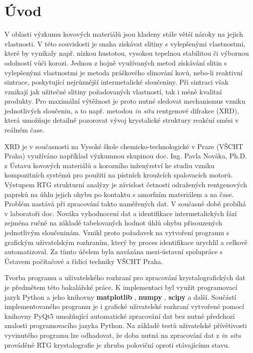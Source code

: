 \documentclass[a4paper, 12pt]{article}
\begin{document}
\newpage

\tableofcontents
\newpage

\pagestyle{fancy}
\section{Úvod}
V oblasti výzkumu kovových materiálů jsou kladeny stále větší nároky na jejich vlastnosti. V této souvislosti je snaha získávat slitiny s vylepšenými vlastnostmi, které by vynikaly např. nízkou hustotou, vysokou tepelnou stabilitou či výbornou odolností vůči korozi. \cite{NOVAK2009123} Jednou z hojně využívaných metod získávání slitin s vylepšenými vlastnostmi je metoda práškového slinování kovů, nebo-li reaktivní sintrace, poskytující nejrůznější intermetalické sloučeniny. \cite{novak2012pvriprava} Při sintraci však vznikají jak užitečné slitiny požadovaných vlastností, tak i méně kvalitní produkty. Pro maximální výtěžnost je proto nutné sledovat mechanismus vzniku jednotlivých sloučenin, a to např. metodou \textit{in situ} rentgenové difrakce (XRD), která umožňuje detailně pozorovat vývoj krystalické struktury reakční směsi v reálném čase. \cite{NOVAKxrd} \par

XRD je v současnosti na Vysoké škole chemicko-technologické v Praze (VŠCHT Praha) využíváno například výzkumnou skupinou doc. Ing. Pavla Nováka, Ph.D. z Ústavu kovových materiálů a korozního inženýrství ke studiu vzniku kompozitních systémů pro použití na pístních kroužcích spalovacích motorů. \cite{UKMKIvscht} Výstupem RTG strukturní analýzy je závislost četnosti odražených rentgenových paprsků na úhlu jejich ohybu po kontaktu s amorfním materiálem a na čase. \cite{XRD} Problém nastává při zpracování takto naměřených dat. V současné době probíhá v laboratoři doc. Nováka vyhodnocení dat a identifikace intermetalických fází zejména ručně na základě tabelovaných hodnot úhlů ohybu přisouzených jednotlivým sloučeninám. Vznikl proto požadavek na vytvoření programu s grafickým uživatelským rozhraním, který by proces identifikace urychlil a celkově automatizoval. Za tímto účelem byla navázána mezi-ústavní spolupráce s Ústavem počítačové a řídící techniky VŠCHT Praha. \par

Tvorba programu a uživatelského rozhraní pro zpracování krystalografických dat je předmětem této bakalářské práce. K implementaci byl využit programovací jazyk Python \cite{pythonorg} a jeho knihovny \textbf{matplotlib} \cite{PltLib}, \textbf{numpy} \cite{NPY}, \textbf{scipy}  \cite{SciOrg} a další. Součástí implementovaného programu je i grafické uživatelské rozhraní vytvořené pomocí knihovny PyQt5 \cite{PyQt} umožňující automatické zpracování dat bez nutné předchozí znalosti programovacího jazyka Python. Na základě testů uživatelské přívětivosti vyvinutého programu lze odhadovat, že doba nutná na zpracování dat z \textit{in situ} prováděné RTG krystalografie je zhruba poloviční oproti stávajícímu stavu.
\end{document}
